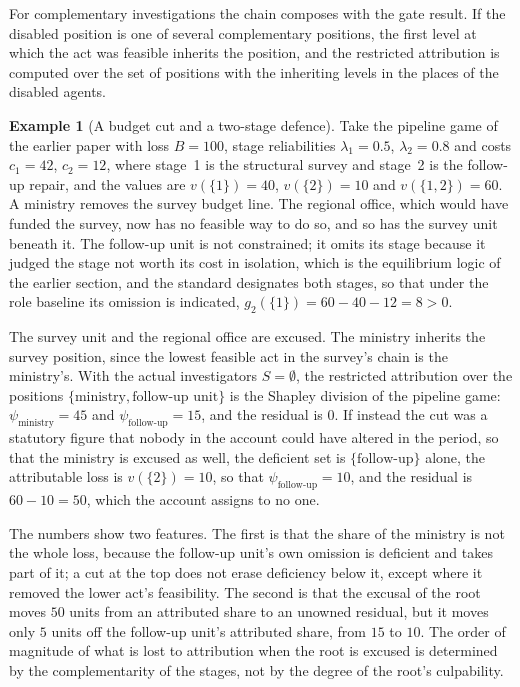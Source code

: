 \documentclass[11pt]{article}
\theoremstyle{plain}
\theoremstyle{definition}
\newtheorem{example}{Example}
\begin{document}
For complementary investigations the chain composes with the gate result. If the disabled position is one of several complementary positions, the first level at which the act was feasible inherits the position, and the restricted attribution is computed over the set of positions with the inheriting levels in the places of the disabled agents.

\begin{example}[A budget cut and a two-stage defence]\label{ex:chain}
Take the pipeline game of the earlier paper with loss $B=100$, stage reliabilities $\lambda_1=0.5$, $\lambda_2=0.8$ and costs $c_1=42$, $c_2=12$, where stage~1 is the structural survey and stage~2 is the follow-up repair, and the values are $v(\{1\})=40$, $v(\{2\})=10$ and $v(\{1,2\})=60$. A ministry removes the survey budget line. The regional office, which would have funded the survey, now has no feasible way to do so, and so has the survey unit beneath it. The follow-up unit is not constrained; it omits its stage because it judged the stage not worth its cost in isolation, which is the equilibrium logic of the earlier section, and the standard designates both stages, so that under the role baseline its omission is indicated, $g_2(\{1\})=60-40-12=8>0$.

The survey unit and the regional office are excused. The ministry inherits the survey position, since the lowest feasible act in the survey's chain is the ministry's. With the actual investigators $S=\emptyset$, the restricted attribution over the positions $\{\text{ministry}, \text{follow-up unit}\}$ is the Shapley division of the pipeline game: $\psi_{\text{ministry}}=45$ and $\psi_{\text{follow-up}}=15$, and the residual is $0$. If instead the cut was a statutory figure that nobody in the account could have altered in the period, so that the ministry is excused as well, the deficient set is $\{\text{follow-up}\}$ alone, the attributable loss is $v(\{2\})=10$, so that $\psi_{\text{follow-up}}=10$, and the residual is $60-10=50$, which the account assigns to no one.
\end{example}

The numbers show two features. The first is that the share of the ministry is not the whole loss, because the follow-up unit's own omission is deficient and takes part of it; a cut at the top does not erase deficiency below it, except where it removed the lower act's feasibility. The second is that the excusal of the root moves $50$ units from an attributed share to an unowned residual, but it moves only $5$ units off the follow-up unit's attributed share, from $15$ to $10$. The order of magnitude of what is lost to attribution when the root is excused is determined by the complementarity of the stages, not by the degree of the root's culpability.
\end{document}
